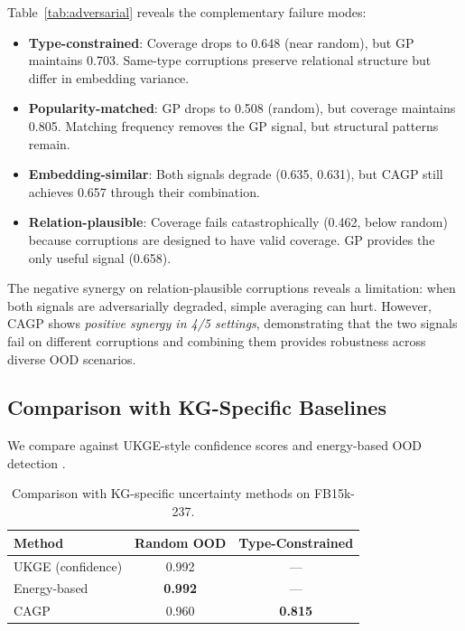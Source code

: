 Table~\ref{tab:adversarial} reveals the complementary failure modes:
\begin{itemize}
    \item \textbf{Type-constrained}: Coverage drops to 0.648 (near random), but GP maintains 0.703. Same-type corruptions preserve relational structure but differ in embedding variance.
    \item \textbf{Popularity-matched}: GP drops to 0.508 (random), but coverage maintains 0.805. Matching frequency removes the GP signal, but structural patterns remain.
    \item \textbf{Embedding-similar}: Both signals degrade (0.635, 0.631), but CAGP still achieves 0.657 through their combination.
    \item \textbf{Relation-plausible}: Coverage fails catastrophically (0.462, below random) because corruptions are designed to have valid coverage. GP provides the only useful signal (0.658).
\end{itemize}

The negative synergy on relation-plausible corruptions reveals a limitation: when both signals are adversarially degraded, simple averaging can hurt.
However, CAGP shows \emph{positive synergy in 4/5 settings}, demonstrating that the two signals fail on different corruptions and combining them provides robustness across diverse OOD scenarios.

\subsection{Comparison with KG-Specific Baselines}

We compare against UKGE-style confidence scores and energy-based OOD detection \citep{liu2020energy}.

\begin{table}[t]
\centering
\caption{Comparison with KG-specific uncertainty methods on FB15k-237.}
\label{tab:baselines}
\vspace{0.5em}
\begin{tabular}{lcc}
\toprule
Method & Random OOD & Type-Constrained \\
\midrule
UKGE (confidence) & 0.992 & --- \\
Energy-based & \textbf{0.992} & --- \\
CAGP & 0.960 & \textbf{0.815} \\
\bottomrule
\end{tabular}
\end{table}

